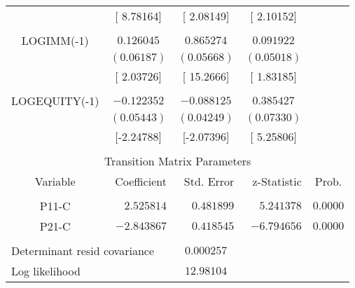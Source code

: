 \begin{tabular}{lrrrr}
\multicolumn{1}{c}{}&\multicolumn{1}{c}{[ 8.78164]}&\multicolumn{1}{c}{[ 2.08149]}&\multicolumn{1}{c}{[ 2.10152]}&\multicolumn{1}{c}{}\\
\multicolumn{1}{c}{}&\multicolumn{1}{c}{}&\multicolumn{1}{c}{}&\multicolumn{1}{c}{}&\multicolumn{1}{c}{}\\
\multicolumn{1}{c}{LOGIMM(-1)}&\multicolumn{1}{c}{$0.126045$}&\multicolumn{1}{c}{$0.865274$}&\multicolumn{1}{c}{$0.091922$}&\multicolumn{1}{c}{}\\
\multicolumn{1}{c}{}&\multicolumn{1}{c}{$(0.06187)$}&\multicolumn{1}{c}{$(0.05668)$}&\multicolumn{1}{c}{$(0.05018)$}&\multicolumn{1}{c}{}\\
\multicolumn{1}{c}{}&\multicolumn{1}{c}{[ 2.03726]}&\multicolumn{1}{c}{[ 15.2666]}&\multicolumn{1}{c}{[ 1.83185]}&\multicolumn{1}{c}{}\\
\multicolumn{1}{c}{}&\multicolumn{1}{c}{}&\multicolumn{1}{c}{}&\multicolumn{1}{c}{}&\multicolumn{1}{c}{}\\
\multicolumn{1}{c}{LOGEQUITY(-1)}&\multicolumn{1}{c}{$-0.122352$}&\multicolumn{1}{c}{$-0.088125$}&\multicolumn{1}{c}{$0.385427$}&\multicolumn{1}{c}{}\\
\multicolumn{1}{c}{}&\multicolumn{1}{c}{$(0.05443)$}&\multicolumn{1}{c}{$(0.04249)$}&\multicolumn{1}{c}{$(0.07330)$}&\multicolumn{1}{c}{}\\
\multicolumn{1}{c}{}&\multicolumn{1}{c}{[-2.24788]}&\multicolumn{1}{c}{[-2.07396]}&\multicolumn{1}{c}{[ 5.25806]}&\multicolumn{1}{c}{}\\
[4.5pt] \hline \\ [-4.5pt]
\multicolumn{5}{c}{Transition Matrix Parameters}\\
\multicolumn{1}{c}{Variable}&\multicolumn{1}{r}{Coefficient}&\multicolumn{1}{r}{Std. Error}&\multicolumn{1}{r}{z-Statistic}&\multicolumn{1}{c}{Prob.}\\
[4.5pt] \hline \\ [-4.5pt]
\multicolumn{1}{c}{P11-C}&\multicolumn{1}{r}{$2.525814$}&\multicolumn{1}{r}{$0.481899$}&\multicolumn{1}{r}{$5.241378$}&\multicolumn{1}{c}{$0.0000$}\\
\multicolumn{1}{c}{P21-C}&\multicolumn{1}{r}{$-2.843867$}&\multicolumn{1}{r}{$0.418545$}&\multicolumn{1}{r}{$-6.794656$}&\multicolumn{1}{c}{$0.0000$}\\
[4.5pt] \hline \\ [-4.5pt]
\multicolumn{2}{l}{Determinant resid covariance}&\multicolumn{1}{c}{$0.000257$}&\multicolumn{1}{c}{}&\multicolumn{1}{c}{}\\
\multicolumn{1}{l}{Log likelihood}&\multicolumn{1}{c}{}&\multicolumn{1}{c}{$12.98104$}&\multicolumn{1}{c}{}&\multicolumn{1}{c}{}\\

\end{tabular}
